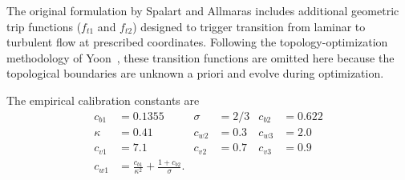 The original formulation by Spalart and Allmaras \cite{Spalart1994} includes additional geometric trip functions ($f_{t1}$ and $f_{t2}$) designed to trigger transition from laminar to turbulent flow at prescribed coordinates. Following the topology-optimization methodology of Yoon~\cite{Yoon2016}, these transition functions are omitted here because the topological boundaries are unknown a priori and evolve during optimization.

The empirical calibration constants are
\begin{align*}
	c_{b1} &= 0.1355 & \sigma &= 2/3 & c_{b2} &= 0.622 \\
	\kappa &= 0.41 & c_{w2} &= 0.3 & c_{w3} &= 2.0 \\
	c_{v1} &= 7.1 & c_{v2} &= 0.7 & c_{v3} &= 0.9 \\
	c_{w1} &= \frac{c_{b1}}{\kappa^2} + \frac{1 + c_{b2}}{\sigma}.
\end{align*}
